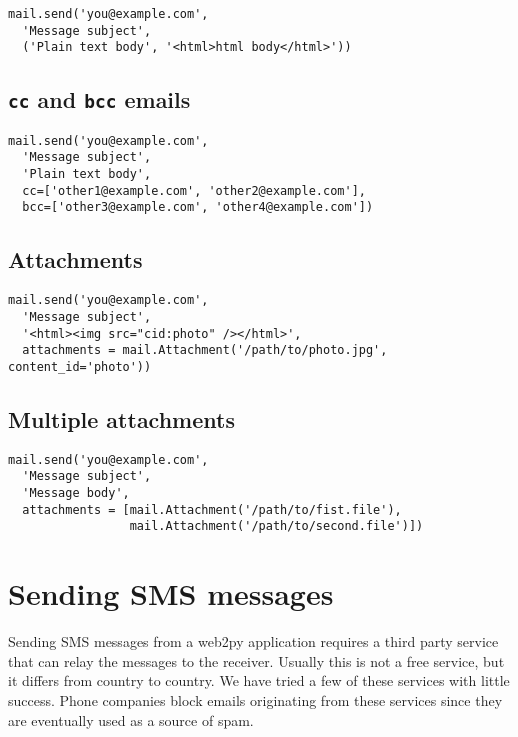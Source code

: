 \documentclass[justified,sixbynine,notoc]{tufte-book}
\def\ft{\small\tt}
\def\inxx#1{\index{#1}}
\begin{document}
\begin{fullwidth}
\begin{lstlisting}
mail.send('you@example.com',
  'Message subject',
  ('Plain text body', '<html>html body</html>'))
\end{lstlisting}

\goodbreak\subsection{{\ft cc} and {\ft bcc} emails}

\begin{lstlisting}
mail.send('you@example.com',
  'Message subject',
  'Plain text body',
  cc=['other1@example.com', 'other2@example.com'],
  bcc=['other3@example.com', 'other4@example.com'])
\end{lstlisting}

\goodbreak\subsection{Attachments}

\begin{lstlisting}
mail.send('you@example.com',
  'Message subject',
  '<html><img src="cid:photo" /></html>',
  attachments = mail.Attachment('/path/to/photo.jpg', content_id='photo'))
\end{lstlisting}

\goodbreak\subsection{Multiple attachments}

\begin{lstlisting}
mail.send('you@example.com',
  'Message subject',
  'Message body',
  attachments = [mail.Attachment('/path/to/fist.file'),
                 mail.Attachment('/path/to/second.file')])
\end{lstlisting}

\goodbreak\section{Sending SMS messages}

\inxx{SMS}
Sending SMS messages from a web2py application requires a third party service that can relay the messages to the receiver. Usually this is not a free service, but it differs from country to country. We have tried a few of these services with little success. Phone companies block emails originating from these services since they are eventually used as a source of spam.


\end{fullwidth}
\end{document}

